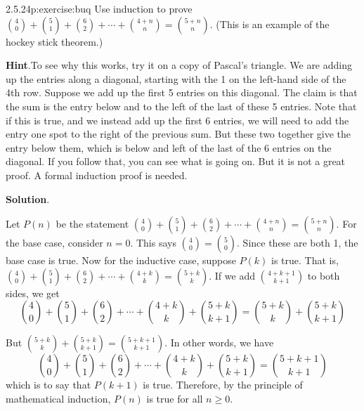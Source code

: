 \documentclass[twoside,11pt,]{book}
\newcommand{\blocktitlefont}{\relax}
\numberwithin{equation}{chapter}
\begin{document}
\begin{divisionsolution}{2.5.24}{}{p:exercise:buq}%
Use induction to prove \({4 \choose 0} + {5 \choose 1} + {6 \choose 2} + \cdots + {4+n \choose n} = {5+n \choose n}\). (This is an example of the hockey stick theorem.)%
\par\smallskip%
\noindent\textbf{\blocktitlefont Hint}.\quad{}To see why this works, try it on a copy of Pascal's triangle. We are adding up the entries along a diagonal, starting with the 1 on the left-hand side of the 4th row. Suppose we add up the first 5 entries on this diagonal. The claim is that the sum is the entry below and to the left of the last of these 5 entries. Note that if this is true, and we instead add up the first 6 entries, we will need to add the entry one spot to the right of the previous sum. But these two together give the entry below them, which is below and left of the last of the 6 entries on the diagonal. If you follow that, you can see what is going on. But it is not a great proof. A formal induction proof is needed.%
\par\smallskip%
\noindent\textbf{\blocktitlefont Solution}.\quad{}\begin{solutionproof}
Let \(P(n)\) be the statement \({4 \choose 0} + {5 \choose 1} + {6 \choose 2} + \cdots + {4+n \choose n} = {5+n \choose n}\). For the base case, consider \(n = 0\). This says \({4 \choose 0} = {5 \choose 0}\). Since these are both 1, the base case is true. Now for the inductive case, suppose \(P(k)\) is true. That is, \({4 \choose 0} + {5 \choose 1} + {6 \choose 2} + \cdots + {4+k \choose k} = {5+k \choose k}\). If we add \({4+k+1 \choose k+1}\) to both sides, we get%
\begin{equation*}
{4 \choose 0} + {5 \choose 1} + {6 \choose 2} + \cdots + {4+k \choose k} + {5+k \choose k+1}= {5+k \choose k} + {5+k \choose k+1}
\end{equation*}
%
\par
But \({5+k \choose k} + {5+k \choose k+1} = {5+k+1 \choose k+1}\). In other words, we have%
\begin{equation*}
{4 \choose 0} + {5 \choose 1} + {6 \choose 2} + \cdots + {4+k \choose k} + {5+k \choose k+1} = {5+k+1 \choose k+1}
\end{equation*}
which is to say that \(P(k+1)\) is true. Therefore, by the principle of mathematical induction, \(P(n)\) is true for all \(n \ge 0\).%
\end{solutionproof}
\end{divisionsolution}%
\end{document}
